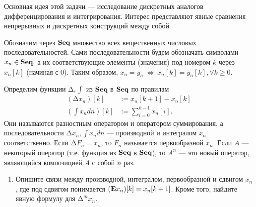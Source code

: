 
Основная идея этой задачи --- исследование дискретных аналогов дифференцирования и интегрирования. Интерес представляют явные сравнения непрерывных и дискретных конструкций между собой. 

Обозначим через $\text{\bf Seq}$ множество всех вещественных числовых последовательностей. Сами последовательности будем обозначать символами $x_n \in \text{\bf Seq},$ а их соответствующие элементы (значения) под номером $k$ через $x_n[k]$ (начиная с 0). Таким образом, $x_n = y_n \ \Longleftrightarrow \ x_n[k] = y_n[k], \forall k \geq 0$. 

Определим функции $\text{Δ}, \int$ из $\text{\bf Seq}$ в $\text{\bf Seq}$ по правилам 
\begin{align*}
(\text{Δ} x_n)[k] &:= x_n[k+1] - x_n[k] \\
\left(\int x_n dn\right) [k] &:= \sum_{i=0}^{k-1} x_n[i].
\end{align*}
Они называются разностным оператором и оператором суммирования, а последовательности $\text{Δ} x_n, \int x_n dn$ --- производной и интегралом $x_n$ соответственно. Если $\text{Δ} F_n = x_n$, то $F_n$ называется первообразной $x_n$. Если $A$ --- некоторый оператор (т.е. функция из $\text{\bf Seq}$ в $\text{\bf Seq}$), то $A^n$ --- это новый оператор, являющийся композицией $A$ с собой $n$ раз. 

\begin{enumerate}
\setcounter{enumi}{0}
\item Опишите связи между производной, интегралом, первообразной и сдвигом $x_n$, где под сдвигом понимается $({\bf E}x_n)[k] = x_n[k+1]$. Кроме того, найдите явную формулу для $\text{Δ}^m x_n$.
\end{enumerate}

